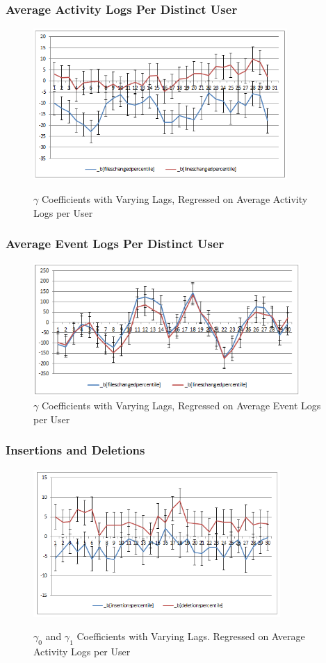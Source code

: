 \documentclass[xcolor=pdftex,dvipsnames,table]{beamer}
\begin{document}
\frame
{
    \frametitle{Average Activity Logs Per Distinct User}
    \begin{figure}[h!]
    \centering
    \includegraphics[width=3.8in]{pictures/avg_activities_time_coefficients.png}
    \label{fig:avg-activities-time-coefficients}
    \caption{$\gamma$ Coefficients with Varying Lags, Regressed on Average Activity Logs per User}
    \end{figure}
}

\frame
{
    \frametitle{Average Event Logs Per Distinct User}
    \begin{figure}[h!]
    \centering
    \includegraphics[width=4in]{pictures/avg_events_time_coefficients.png}
    \caption{$\gamma$ Coefficients with Varying Lags, Regressed on Average Event Logs per User}
    \label{fig:avg-events-time-coefficients}
    \end{figure}
}

\frame
{
    \frametitle{Insertions and Deletions}
    \begin{figure}[h!]
    \centering
    \includegraphics[width=3.7in]{pictures/commit_percentiles_time_coefficients.png}
    \label{fig:insertions-deletions-time-coefficients}
    \caption{$\gamma_0$ and $\gamma_1$ Coefficients with Varying Lags. Regressed on Average Activity Logs per User}
    \centering
    \end{figure}
}
\end{document}
